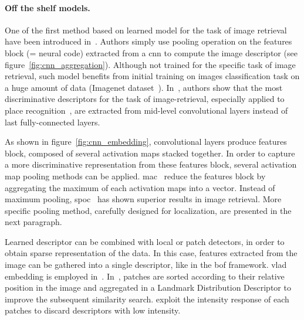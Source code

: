\paragraph{Off the shelf models.} One of the first method based on learned model for the task of image retrieval have been introduced in~\citep{Babenko2014}. Authors simply use pooling operation on the features block (= neural code) extracted from a \ac{cnn} to compute the image descriptor (see figure~\ref{fig:cnn_aggregation}). Although not trained for the specific task of image retrieval, such model benefits from initial training on images classification task on a huge amount of data (\eg Imagenet dataset~\citep{Deng2009}). In~\citep{Babenko2014,Sunderhauf2015}, authors show that the most discriminative descriptors for the task of image-retrieval, especially applied to place recognition~\citep{Sunderhauf2015}, are extracted from mid-level convolutional layers instead of last fully-connected layers. 

As shown in figure~\ref{fig:cnn_embedding}, convolutional layers produce features block, composed of several activation maps stacked together. In order to capture a more discriminative representation from these features block, several activation map pooling methods can be applied. \ac{mac}~\citep{Razavian2014a} reduce the features block by aggregating the maximum of each activation maps into a vector. Instead of maximum pooling, \ac{spoc}~\citep{Babenko2015} has shown superior results in image retrieval. More specific pooling method, carefully designed for localization, are presented in the next paragraph.

Learned descriptor can be combined with local or patch detectors, in order to obtain sparse representation of the data. In this case, features extracted from the image can be gathered into a single descriptor, like in the \ac{bof} framework. \ac{vlad} embedding is employed in~\citep{Yan2016}. In~\citep{Panphattarasap2016}, patches are sorted according to their relative position in the image and aggregated in a Landmark Distribution Descriptor to improve the subsequent similarity search. \citet{Zhi2016} exploit the intensity response of each patches to discard descriptors with low intensity.



